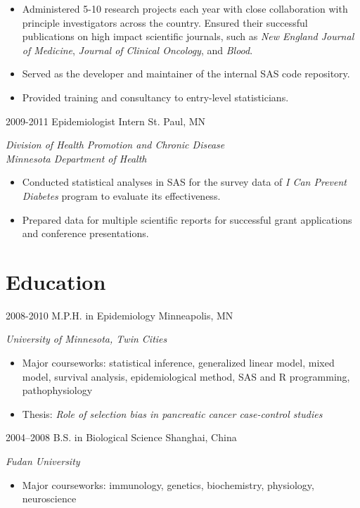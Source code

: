 \begin{entrylist}
{\begin{itemize}
        \item Administered 5-10 research projects each year with close collaboration with principle investigators across the country. Ensured their successful publications on high impact scientific journals, such as \textit{New England Journal of Medicine}, \textit{Journal of Clinical Oncology}, and \textit{Blood}.
        \item Served as the developer and maintainer of the internal SAS code repository.
        \item Provided training and consultancy to entry-level statisticians.
      \end{itemize}
    }
  \entry
    {2009-2011}
    {Epidemiologist Intern}
    {St. Paul, MN}
    {
      \textit{Division of Health Promotion and Chronic Disease \\ Minnesota Department of Health}
      \begin{itemize}
        \item Conducted statistical analyses in SAS for the survey data of \textit{I Can Prevent Diabetes} program to evaluate its effectiveness.
        \item Prepared data for multiple scientific reports for successful grant applications and conference presentations.
      \end{itemize}
    }
\end{entrylist}

\section{Education}

\begin{entrylist}
  \entry
    {2008-2010}
    {M.P.H. in Epidemiology}
    {Minneapolis, MN}
    {
      \textit{University of Minnesota, Twin Cities}
      \begin{itemize}
        \item Major courseworks: statistical inference, generalized linear model, mixed model, survival analysis, epidemiological method, SAS and R programming, pathophysiology
        \item Thesis: \textit{Role of selection bias in pancreatic cancer case-control studies}
      \end{itemize}
    }
  \entry
    {2004–2008}
    {B.S. in Biological Science}
    {Shanghai, China}
    {
      \textit{Fudan University}
      \begin{itemize}
        \item Major courseworks: immunology, genetics, biochemistry, physiology, neuroscience
      \end{itemize}
    }
\end{entrylist}
